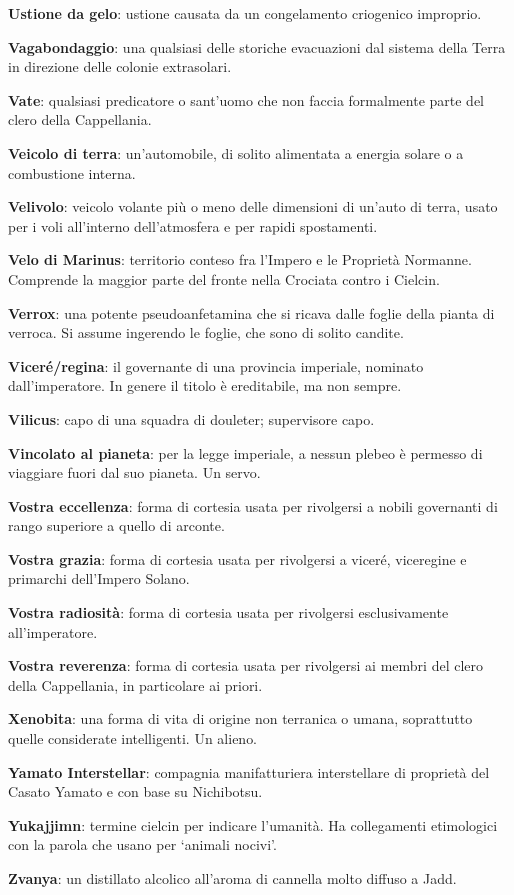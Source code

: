 \textbf{Ustione da gelo}: ustione causata da un congelamento criogenico
improprio.

\textbf{Vagabondaggio}: una qualsiasi delle storiche evacuazioni dal
sistema della Terra in direzione delle colonie extrasolari.

\textbf{Vate}: qualsiasi predicatore o sant'uomo che non faccia
formalmente parte del clero della Cappellania.

\textbf{Veicolo di terra}: un'automobile, di solito alimentata a energia
solare o a combustione interna.

\textbf{Velivolo}: veicolo volante più o meno delle dimensioni di
un'auto di terra, usato per i voli all'interno dell'atmosfera e per
rapidi spostamenti.

\textbf{Velo di Marinus}: territorio conteso fra l'Impero e le Proprietà
Normanne. Comprende la maggior parte del fronte nella Crociata contro i
Cielcin.

\textbf{Verrox}: una potente pseudoanfetamina che si ricava dalle foglie
della pianta di verroca. Si assume ingerendo le foglie, che sono di
solito candite.

\textbf{Viceré/regina}: il governante di una provincia imperiale,
nominato dall'imperatore. In genere il titolo è ereditabile, ma non
sempre.

\textbf{Vilicus}: capo di una squadra di douleter; supervisore capo.

\textbf{Vincolato al pianeta}: per la legge imperiale, a nessun plebeo è
permesso di viaggiare fuori dal suo pianeta. Un servo.

\textbf{Vostra eccellenza}: forma di cortesia usata per rivolgersi a
nobili governanti di rango superiore a quello di arconte.

\textbf{Vostra grazia}: forma di cortesia usata per rivolgersi a viceré,
viceregine e primarchi dell'Impero Solano.

\textbf{Vostra radiosità}: forma di cortesia usata per rivolgersi
esclusivamente all'imperatore.

\textbf{Vostra reverenza}: forma di cortesia usata per rivolgersi ai
membri del clero della Cappellania, in particolare ai priori.

\textbf{Xenobita}: una forma di vita di origine non terranica o umana,
soprattutto quelle considerate intelligenti. Un alieno.

\textbf{Yamato Interstellar}: compagnia manifatturiera interstellare di
proprietà del Casato Yamato e con base su Nichibotsu.

\textbf{Yukajjimn}: termine cielcin per indicare l'umanità. Ha
collegamenti etimologici con la parola che usano per `animali nocivi'.

\textbf{Zvanya}: un distillato alcolico all'aroma di cannella molto
diffuso a Jadd.

\newpage\blankpage